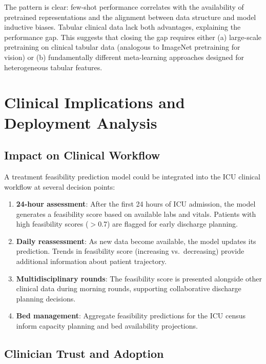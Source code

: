 The pattern is clear: few-shot performance correlates with the availability of pretrained representations and the alignment between data structure and model inductive biases. Tabular clinical data lack both advantages, explaining the performance gap. This suggests that closing the gap requires either (a) large-scale pretraining on clinical tabular data (analogous to ImageNet pretraining for vision) or (b) fundamentally different meta-learning approaches designed for heterogeneous tabular features.

\section{Clinical Implications and Deployment Analysis}

\subsection{Impact on Clinical Workflow}

A treatment feasibility prediction model could be integrated into the ICU clinical workflow at several decision points:

\begin{enumerate}
\item \textbf{24-hour assessment}: After the first 24 hours of ICU admission, the model generates a feasibility score based on available labs and vitals. Patients with high feasibility scores ($>$0.7) are flagged for early discharge planning.
\item \textbf{Daily reassessment}: As new data become available, the model updates its prediction. Trends in feasibility score (increasing vs.\ decreasing) provide additional information about patient trajectory.
\item \textbf{Multidisciplinary rounds}: The feasibility score is presented alongside other clinical data during morning rounds, supporting collaborative discharge planning decisions.
\item \textbf{Bed management}: Aggregate feasibility predictions for the ICU census inform capacity planning and bed availability projections.
\end{enumerate}

\subsection{Clinician Trust and Adoption}

